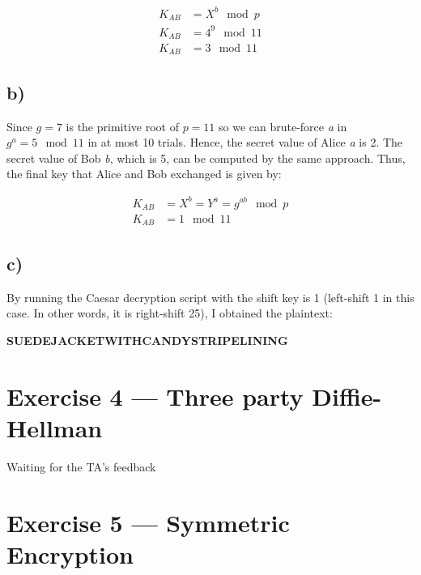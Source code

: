 \documentclass{article}
\begin{document}
\begin{align*}
    K_{AB} &= X^b \mod p\\
    K_{AB} &= 4^9 \mod 11\\
    K_{AB} &= 3 \mod 11
\end{align*}

\subsection*{b)}
Since \(g=7\) is the primitive root of \(p=11\) so we can brute-force
\emph{a} in \(g^a = 5 \mod 11\) in at most 10 trials. Hence, the secret
value of Alice \emph{a} is 2. The secret value of Bob \emph{b}, which is 5, can be
computed by the same approach. Thus, the final key that Alice and Bob exchanged
is given by:

\begin{align*}
    K_{AB} &= X^b = Y^a = g^{ab} \mod p\\
    K_{AB} &= 1 \mod 11 
\end{align*}

\subsection*{c)}
By running the Caesar decryption script with the shift key is 1 (left-shift 1
in this case. In other words, it is right-shift 25), I obtained the plaintext:

\begin{center}
    \textbf{SUEDEJACKETWITHCANDYSTRIPELINING}
\end{center}

\section*{Exercise 4 --- Three party Diffie-Hellman}
%
Waiting for the TA's feedback

\section*{Exercise 5 --- Symmetric Encryption}
%
\end{document}
